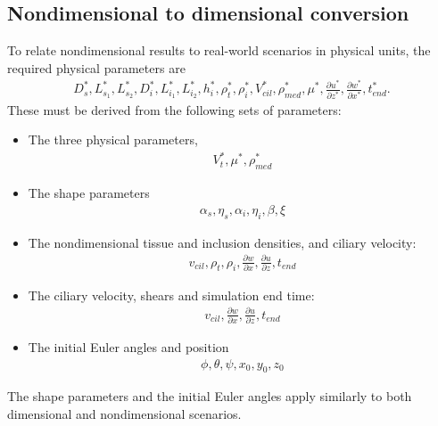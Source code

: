 \documentclass[10pt,a4paper]{article}
\def\non{\nonumber}
\def\p{\partial}
\begin{document}
\subsection{Nondimensional to dimensional conversion}
To relate nondimensional results to real-world scenarios in physical units, the required physical parameters are
\begin{eqnarray}\label{nd2dpars0}
	D^*_s, L^*_{s_1}, L^*_{s_2}, D^*_{i}, L^*_{i_1}, L^*_{i_2}, h^*_i, \rho^*_t, \rho^*_{i}, V^*_{cil}, \rho^*_{med}, \mu^*, \frac{\p u^*}{\p z^*}, \frac{\p w^*}{\p x^*}, t^*_{end}.
\end{eqnarray}
These must be derived from the following sets of parameters:
\begin{itemize}
	\item The three physical parameters,
		\begin{eqnarray}\label{nd2dpars0a}
			V_t^*, \mu^*, \rho^*_{med}	
		\end{eqnarray}
	\item The shape parameters 
		\begin{eqnarray}\label{nd2dpars2}
			\alpha_s, \eta_s, \alpha_{i}, \eta_{i}, \beta, \xi
		\end{eqnarray}
	\item The nondimensional tissue and inclusion densities, and ciliary velocity:
		\begin{eqnarray}\label{nd2dpars1a}
			v_{cil}, \rho_t, \rho_i, \frac{\p w}{\p x}, \frac{\p u}{\p z}, t_{end}
		\end{eqnarray}
	\item The ciliary velocity, shears and simulation end time:
		\begin{eqnarray}\label{nd2dpars1b}
			v_{cil}, \frac{\p w}{\p x}, \frac{\p u}{\p z}, t_{end}
		\end{eqnarray}
	\item The initial Euler angles and position
		\begin{eqnarray}\label{nd2dpars2a}
			\phi, \theta, \psi, x_0, y_0, z_0
		\end{eqnarray}	 	
\end{itemize}
The shape parameters and the initial Euler angles apply similarly to both dimensional and nondimensional scenarios.
\end{document}
